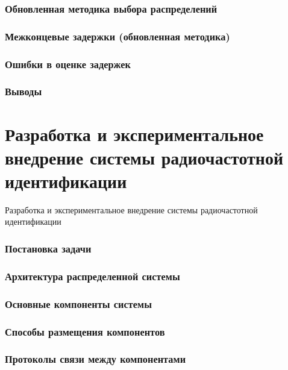 \begin{frame}
    \frametitle{Обновленная методика выбора распределений}
\end{frame}

\begin{frame}
    \frametitle{Межконцевые задержки (обновленная методика)}
\end{frame}

\begin{frame}
    \frametitle{Ошибки в оценке задержек}
\end{frame}

\begin{frame}
    \frametitle{Выводы}
\end{frame}


\section{Разработка и экспериментальное внедрение системы радиочастотной идентификации}
\begin{frame}
    \begin{center}
        \Huge
        Разработка и экспериментальное внедрение системы радиочастотной идентификации
    \end{center}
\end{frame}

\begin{frame}
    \frametitle{Постановка задачи}
\end{frame}

\begin{frame}
    \frametitle{Архитектура распределенной системы}
\end{frame}

\begin{frame}
    \frametitle{Основные компоненты системы}
\end{frame}

\begin{frame}
    \frametitle{Способы размещения компонентов}
\end{frame}

\begin{frame}
    \frametitle{Протоколы связи между компонентами}
\end{frame}

